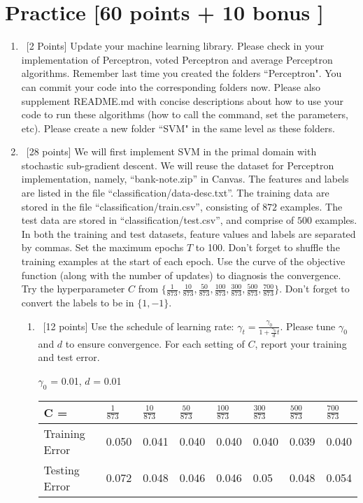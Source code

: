 \documentclass[12pt, fullpage,letterpaper]{article}
\begin{document}
\section{Practice [60 points + 10 bonus ]}
\begin{enumerate}
	\item~[2 Points] Update your machine learning library. Please check in your implementation of Perceptron, voted Perceptron and average Perceptron algorithms. Remember last time you created the folders ``Perceptron". You can commit your code into the corresponding folders now. Please also supplement README.md with concise descriptions about how to use your code to run these algorithms (how to call the command, set the parameters, etc). Please create a new folder ``SVM" in the same level as these folders.  

	\item~[28 points] We will first implement SVM in the primal domain with stochastic sub-gradient descent. We will reuse the  dataset for Perceptron implementation, namely, ``bank-note.zip'' in Canvas. The features and labels are listed in the file ``classification/data-desc.txt''. The training data are stored in the file ``classification/train.csv'', consisting of $872$ examples. The test data are stored in ``classification/test.csv'', and comprise of $500$ examples. In both the training and test datasets, feature values and labels are separated by commas. Set the maximum epochs $T$ to 100. Don't forget to shuffle the training examples at the start of each epoch. Use the curve of the objective function (along with the number of updates) to diagnosis the convergence. Try the hyperparameter $C$ from $\{\frac{1}{873}, \frac{10}{873}, \frac{50}{873}, \frac{100}{873}, \frac{300}{873}, \frac{500}{873}, \frac{700}{873}\}$. Don't forget to convert the labels to be in $\{1, -1\}$.  
	\begin{enumerate}
		\item~[12 points] Use the schedule of learning rate: $\gamma_t = \frac{\gamma_0}{1+\frac{\gamma_0}{d}t}	$. Please tune $\gamma_0$ and $d$ to ensure convergence. For each setting of $C$, report your training and test error. 
		
		\bigskip
		$\gamma_0$ = 0.01, $d$ = 0.01 
		\begin{table}[h]
			\begin{tabular}{l||lllllll}
				C = & $\frac{1}{873}$ & $\frac{10}{873}$ & $\frac{50}{873}$ & $\frac{100}{873}$ & $\frac{300}{873}$ & $\frac{500}{873}$ & $\frac{700}{873}$ \\
				\hline\hline
				Training Error & 0.050 & 0.041 & 0.040 & 0.040 & 0.040 & 0.039 & 0.040 \\
				Testing Error & 0.072 & 0.048 & 0.046 & 0.046 & 0.05 & 0.048 & 0.054 \\
			\end{tabular}
		\end{table}
		

\end{enumerate}
\end{enumerate}
\end{document}
